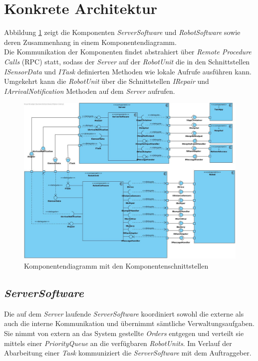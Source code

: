 \section{Konkrete Architektur}

Abbildung \ref{KomponentendiagrammKonkret} zeigt die Komponenten \emph{ServerSoftware} und \emph{RobotSoftware} sowie deren Zusammenhang in einem Komponentendiagramm. \\ Die Kommunikation der Komponenten findet abstrahiert über \emph{Remote Procedure Calls} (RPC) statt, sodass der \emph{Server} auf der \emph{RobotUnit} die in den Schnittstellen \emph{ISensorData} und \emph{ITask} definierten Methoden wie lokale Aufrufe ausführen kann. Umgekehrt kann die \emph{RobotUnit} über die Schnittstellen \emph{IRepair} und \emph{IArrivalNotification} Methoden auf dem \emph{Server} aufrufen.

\begin{figure}[H]
\centering
\includegraphics[width=1\textwidth]{img/2-Entwurf-4-KonkreteArchitektur}
\caption{Komponentendiagramm mit den Komponentenschnittstellen}
\label{KomponentendiagrammKonkret}
\end{figure}

\subsection{\textit{ServerSoftware}}

Die auf dem \emph{Server} laufende \emph{ServerSoftware} koordiniert sowohl die externe als auch die interne Kommunikation und übernimmt sämtliche Verwaltungsaufgaben.
Sie nimmt von extern an das System gestellte \emph{Orders} entgegen und verteilt sie mittels einer \emph{PriorityQueue} an die verfügbaren \emph{RobotUnits}. Im Verlauf der Abarbeitung einer \emph{Task} kommuniziert die \emph{ServerSoftware} mit dem Auftraggeber.

